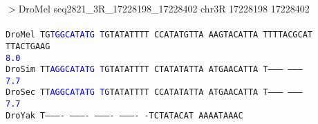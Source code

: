 \documentclass[11pt,twoside,reqno,a4paper]{article}
\begin{document}
\noindent
\newlength{\charwidth}$>$DroMel	seq2821\_3R\_17228198\_17228402	chr3R	17228198	17228402 \\
 \\
\texttt{DroMel	TG\textcolor{Blue}{T}\textcolor{Blue}{G}\textcolor{Blue}{G}\textcolor{Blue}{C}\textcolor{Blue}{A}\textcolor{Blue}{T}\textcolor{Blue}{A}\textcolor{Blue}{T}\textcolor{Blue}{G}	\textcolor{Blue}{T}GTATATTTT	CCATATGTTA	AAGTACATTA	TTTTACGCAT	TTACTGAAG\\
\hspace*{7\charwidth}\hspace*{2\charwidth}\textcolor{Blue}{8.0}\hspace*{1\charwidth}\hspace*{1\charwidth}\hspace*{1\charwidth}\hspace*{1\charwidth}\hspace*{1\charwidth}\\
DroSim	TT\textcolor{Blue}{A}\textcolor{Blue}{G}\textcolor{Blue}{G}\textcolor{Blue}{C}\textcolor{Blue}{A}\textcolor{Blue}{T}\textcolor{Blue}{A}\textcolor{Blue}{T}\textcolor{Blue}{G}	\textcolor{Blue}{T}GTATATTTT	CTATATATTA	ATGAACATTA	T---------	---------\\
\hspace*{7\charwidth}\hspace*{2\charwidth}\textcolor{Blue}{7.7}\hspace*{1\charwidth}\hspace*{1\charwidth}\hspace*{1\charwidth}\hspace*{1\charwidth}\hspace*{1\charwidth}\\
DroSec	TT\textcolor{Blue}{A}\textcolor{Blue}{G}\textcolor{Blue}{G}\textcolor{Blue}{C}\textcolor{Blue}{A}\textcolor{Blue}{T}\textcolor{Blue}{A}\textcolor{Blue}{T}\textcolor{Blue}{G}	\textcolor{Blue}{T}GTATATTTT	CCATATATTA	ATGAACATTA	T---------	---------\\
\hspace*{7\charwidth}\hspace*{2\charwidth}\textcolor{Blue}{7.7}\hspace*{1\charwidth}\hspace*{1\charwidth}\hspace*{1\charwidth}\hspace*{1\charwidth}\hspace*{1\charwidth}\\
DroYak	T----------	----------	----------	----------	-TCTATACAT	AAAATAAAC\\
}
\end{document}
